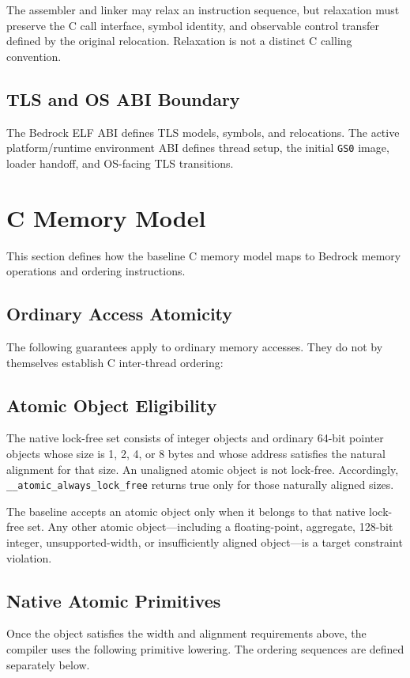 \documentclass[10pt,twoside]{article}
\begin{document}


The assembler and linker may relax an instruction sequence, but relaxation
must preserve the C call interface, symbol identity, and observable control
transfer defined by the original relocation. Relaxation is not a distinct C
calling convention.

\subsection{TLS and OS ABI Boundary}
The Bedrock ELF ABI defines TLS models, symbols, and relocations. The active
platform/runtime environment ABI defines thread setup, the initial \texttt{GS0}
image, loader handoff, and OS-facing TLS transitions.

\section{C Memory Model}\label{page:c-memory-model}
This section defines how the baseline C memory model maps to Bedrock memory
operations and ordering instructions.

\subsection{Ordinary Access Atomicity}
The following guarantees apply to ordinary memory accesses. They do not by
themselves establish C inter-thread ordering:



\subsection{Atomic Object Eligibility}
The native lock-free set consists of integer objects and ordinary 64-bit
pointer objects whose size is 1, 2, 4, or 8 bytes and whose address satisfies
the natural alignment for that size. An unaligned atomic object is not
lock-free. Accordingly, \texttt{\_\_atomic\_always\_lock\_free} returns true
only for those naturally aligned sizes.

The baseline accepts an atomic object only when it belongs to that native
lock-free set. Any other atomic object---including a floating-point, aggregate,
128-bit integer, unsupported-width, or insufficiently aligned
object---is a target constraint violation.

\subsection{Native Atomic Primitives}
Once the object satisfies the width and alignment requirements above, the
compiler uses the following primitive lowering. The ordering sequences are
defined separately below.
\end{document}

